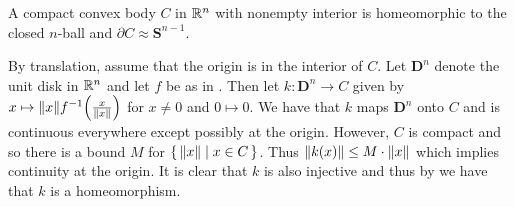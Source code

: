 \documentclass[letterpaper, 11pt, oneside]{book}
\begin{document}
\clearpage

\begin{thrm}
  A compact convex body $C$ in $\mathbb{R}^{n}$ with nonempty interior is homeomorphic to the closed $n$-ball and $\partial C \approx \textbf{S}^{n - 1}$.
\end{thrm}
\begin{pf}
  By translation, assume that the origin is in the interior of $C$.
  Let $\textbf{D}^{n}$ denote the unit disk in $\mathbb{R}^{n}$ and let $f$ be as in .
  Then let $k\colon \textbf{D}^{n} \to C$ given by $x \mapsto \norm{x} f^{-1}\pqty{\frac{x}{\norm{x}}}$ for $x \neq 0$ and $0 \mapsto 0$.
  We have that $k$ maps $\textbf{D}^{n}$ onto $C$ and is continuous everywhere except possibly at the origin.
  However, $C$ is compact and so there is a bound $M$ for $\set{\norm{x} | x \in C}$.
  Thus $\norm{k(x)} \leq M \cdot \norm{x}$ which implies continuity at the origin.
  It is clear that $k$ is also injective and thus by  we have that $k$ is a homeomorphism.
\end{pf}

\clearpage
\nocite{note:conrad_topologist_sine}
\nocite{note:compactness_review}
\nocite{book:Rudin_RCA}
\nocite{book:Steen_Seebach}
\nocite{book:Munkres}
\nocite{book:Lee_ITM}
\nocite{book:hatcher_AT}
\printbibliography
\end{document}
